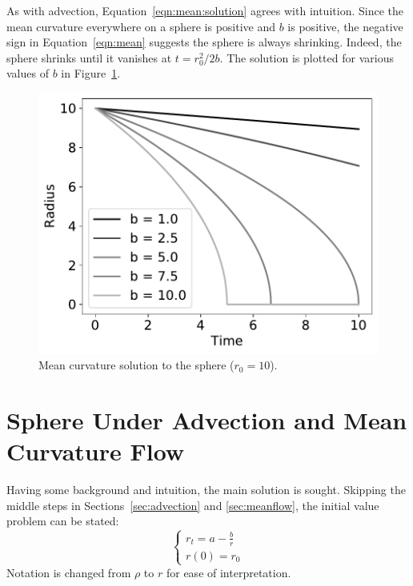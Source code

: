 \documentclass[journal]{IEEEtran}
\begin{document}
As with advection, Equation~\ref{eqn:mean:solution} agrees with intuition.
Since the mean curvature everywhere on a sphere is positive and $b$ is positive, the negative sign in Equation~\ref{eqn:mean} suggests the sphere is always shrinking.
Indeed, the sphere shrinks until it vanishes at $t = r_0^2/2b$.
The solution is plotted for various values of $b$ in Figure~\ref{fig:mean}.

\begin{figure}[t]
  \centering
    \includegraphics[width=0.9\linewidth]{mean}%
  \caption{Mean curvature solution to the sphere ($r_0 = 10$).}
  \label{fig:mean}
\end{figure}

\section{Sphere Under Advection and Mean Curvature Flow}
Having some background and intuition, the main solution is sought.
Skipping the middle steps in Sections~\ref{sec:advection} and \ref{sec:meanflow}, the initial value problem can be stated:
\begin{equation}
  \label{eqn:base}
  \left\{
    \begin{array}{ll}
      r_t = a - \frac{b}{r}\\
      r(0) = r_0
    \end{array}
  \right.
\end{equation}
Notation is changed from $\rho$ to $r$ for ease of interpretation.
\end{document}
